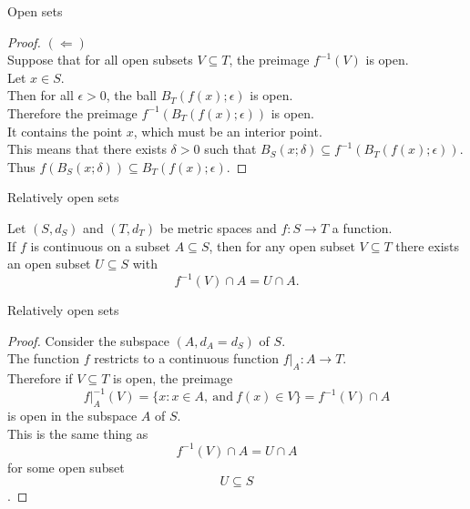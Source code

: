 \documentclass{beamer}
\begin{document}
\begin{frame}{Open sets}
\begin{proof}
\pause
$(\Leftarrow)$\\
\pause
Suppose that for all open subsets $V\subseteq T$, the preimage $f^{-1}(V)$ is open.\\
\pause
Let $x\in S$.\\
\pause
Then for all $\epsilon > 0$, the ball $B_T(f(x);\epsilon)$ is open.\\
\pause
Therefore the preimage $f^{-1}(B_T(f(x);\epsilon))$ is open.\\
\pause
It contains the point $x$, which must be an interior point.\\
\pause
This means that there exists $\delta > 0$ such that $B_S(x;\delta)\subseteq f^{-1}(B_T(f(x);\epsilon)).$\\
\pause
Thus $f(B_S(x;\delta))\subseteq B_T(f(x);\epsilon)$.
\end{proof}
\end{frame}

\begin{frame}{Relatively open sets}
\begin{thm}
Let $(S,d_S)$ and $(T,d_T)$ be metric spaces and $f: S\rightarrow T$ a function.\\
If $f$ is continuous on a subset $A\subseteq S$, then for any open subset $V\subseteq T$ there exists an open subset $U\subseteq S$ with 
$$f^{-1}(V)\cap A = U\cap A.$$
\end{thm}
\end{frame}

\begin{frame}{Relatively open sets}
\begin{proof}
\pause
Consider the subspace $(A,d_A=d_S)$ of $S$.\\
\pause
The function $f$ restricts to a continuous function $f|_A: A\rightarrow T$.\\
\pause
Therefore if $V\subseteq T$ is open, the preimage
$$f|_A^{-1}(V) = \{x: x\in A,\ \text{and}\ f(x)\in V\} = f^{-1}(V)\cap A$$
\pause
is open in the subspace $A$ of $S$.\\
\pause
This is the same thing as
$$ f^{-1}(V)\cap A = U\cap A$$
for some open subset $$U\subseteq S$$.
\end{proof}
\end{frame}
\end{document}
